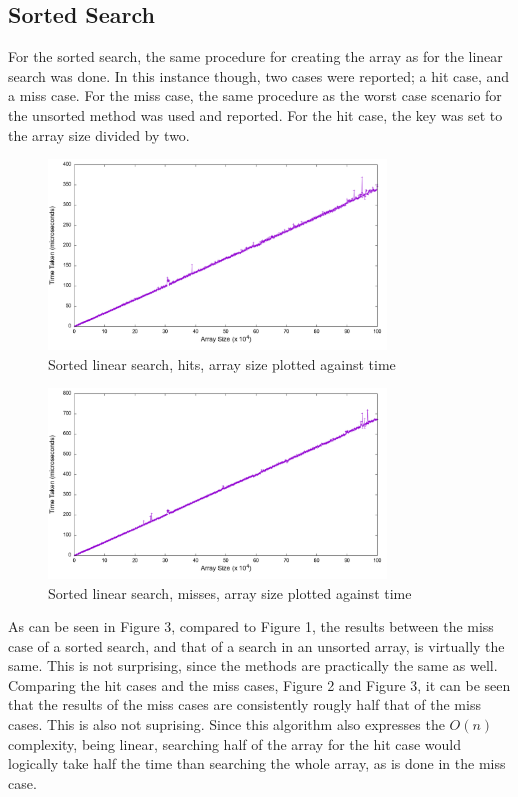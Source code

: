 \documentclass[a4paper,11pt]{article}
\begin{document}
\subsection*{Sorted Search}
For the sorted search, the same procedure for creating the array as for the linear search was done.
In this instance though, two cases were reported; a hit case, and a miss case.
For the miss case, the same procedure as the worst case scenario for the unsorted method was used and reported.
For the hit case, the key was set to the array size divided by two.

\begin{figure}[h!]
  \centering
  \includegraphics[width=0.8\textwidth]{sorted_search_hit_linear}
  \caption{Sorted linear search, hits, array size plotted against time}
  \label{fig:sorted_search_hit_linear_plot}
\end{figure}

\begin{figure}[h!]
  \centering
  \includegraphics[width=0.8\textwidth]{sorted_search_miss_linear.png}
  \caption{Sorted linear search, misses, array size plotted against time}
  \label{fig:sorted_search_miss_linear_plot}
\end{figure}

As can be seen in Figure 3, compared to Figure 1, the results between the miss case of a sorted search, and that of a search in an unsorted array, is virtually the same.
This is not surprising, since the methods are practically the same as well.
Comparing the hit cases and the miss cases, Figure 2 and Figure 3, it can be seen that the results of the miss cases are consistently rougly half that of the miss cases.
This is also not suprising.
Since this algorithm also expresses the $O(n)$ complexity, being linear, searching half of the array for the hit case would logically take half the time than searching the whole array,
as is done in the miss case.
\end{document}
